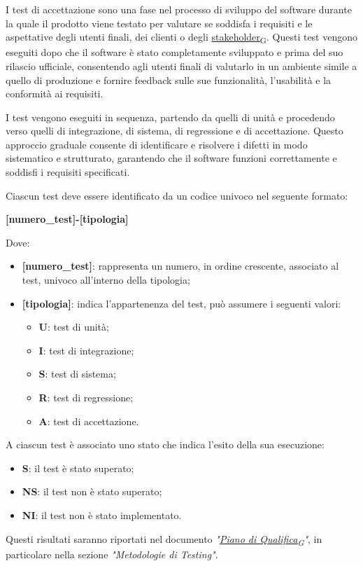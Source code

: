 I test di accettazione sono una fase nel processo di sviluppo del software durante la quale il prodotto viene testato per valutare se soddisfa i requisiti e le aspettative degli utenti finali, dei clienti o degli \href{https://7last.github.io/docs/rtb/documentazione-interna/glossario\#stakeholder}{stakeholder\textsubscript{G}}. Questi test vengono eseguiti dopo che il software è stato completamente sviluppato e prima del suo rilascio ufficiale, consentendo agli utenti finali di valutarlo in un ambiente simile a quello di produzione e fornire feedback sulle sue funzionalità, l'usabilità e la conformità ai requisiti.

I test vengono eseguiti in sequenza, partendo da quelli di unità e procedendo verso quelli di integrazione, di sistema, di regressione e di accettazione. Questo approccio graduale consente di identificare e risolvere i difetti in modo sistematico e strutturato, garantendo che il software funzioni correttamente e soddisfi i requisiti specificati.

Ciascun test deve essere identificato da un codice univoco nel seguente formato:
\begin{center}
	\textbf{[numero\_test]-[tipologia]}
\end{center}
Dove:
\begin{itemize}
	\item \textbf{[numero\_test]}: rappresenta un numero, in ordine crescente, associato al test, univoco all'interno della tipologia;
	\item \textbf{[tipologia]}: indica l'appartenenza del test, può assumere i seguenti valori:
	      \begin{itemize}
		      \item \textbf{U}: test di unità;
		      \item \textbf{I}: test di integrazione;
		      \item \textbf{S}: test di sistema;
		      \item \textbf{R}: test di regressione;
		      \item \textbf{A}: test di accettazione.
	      \end{itemize}

\end{itemize}

A ciascun test è associato uno stato che indica l'esito della sua esecuzione:
\begin{itemize}
	\item \textbf{S}: il test è stato superato;
	\item \textbf{NS}: il test non è stato superato;
	\item \textbf{NI}: il test non è stato implementato.
\end{itemize}
Questi risultati saranno riportati nel documento \textit{"\href{https://7last.github.io/docs/rtb/documentazione-interna/glossario\#piano-di-qualifica}{Piano di Qualifica\textsubscript{G}}"}, in particolare nella sezione \textit{"Metodologie di Testing"}.

